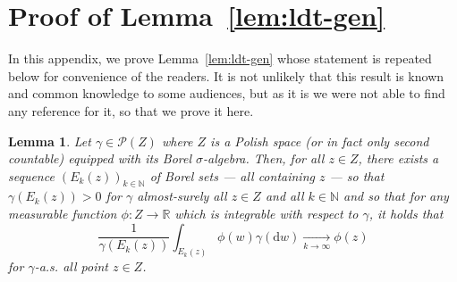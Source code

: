 \documentclass[leqno, 11pt, a4paper]{amsart}
\newtheorem{lem}{Lemma}
\theoremstyle{definition}
\newcommand{\R}{\mathbb{R}}
\newcommand{\N}{\mathbb{N}}
\newcommand{\cP}{\mathcal{P}}
\newcommand{\cto}[1]{\xrightarrow[#1]{}}
\newcommand{\dd}{\mathrm{d}}
\begin{document}
\section{Proof of Lemma~\ref{lem:ldt-gen}}\label{app:ldt}
In this appendix, we prove Lemma~\ref{lem:ldt-gen} whose statement is repeated below for convenience of the readers. It is not unlikely that this result is known and common knowledge to some audiences, but as it is we were not able to find any reference for it, so that we prove it here.
\begin{lem}\label{lem:ldt-gen-repetita}
	Let $\gamma \in \cP(Z)$ where $Z$ is a Polish space (or in fact only second countable) equipped with its Borel $\sigma$-algebra. Then, for all $z \in Z$, there exists a sequence $(E_k(z))_{k \in \N}$ of Borel sets — all containing $z$ — so that $\gamma(E_k(z)) > 0$ for $\gamma$ almost-surely all $z \in Z$ and all $k \in \N$ and so that for any measurable function $\phi : Z \to \R$ which is integrable with respect to $\gamma$, it holds that 
	\begin{equation}
		\frac{1}{\gamma(E_k(z))} \int_{E_k(z)} \phi(w)  \gamma(\dd w) \cto{k \to \infty} \phi(z)
	\end{equation}
	for $\gamma$-a.s. all point $z \in Z$.
\end{lem}
\end{document}

